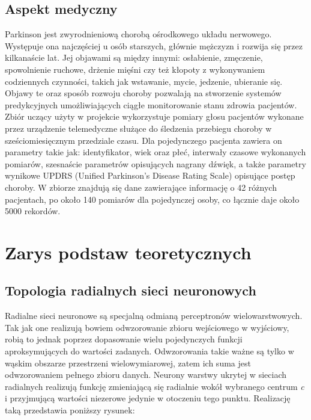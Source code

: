 \documentclass[12pt]{article}
\begin{document}
\subsection{Aspekt medyczny}

Parkinson jest zwyrodnieniową chorobą ośrodkowego układu nerwowego. Występuje ona najczęściej u osób starszych, głównie mężczyzn i rozwija się przez kilkanaście lat. Jej objawami są między innymi: osłabienie, zmęczenie, spowolnienie ruchowe, drżenie mięśni czy też kłopoty z wykonywaniem codziennych czynności, takich jak wstawanie, mycie, jedzenie, ubieranie się.  Objawy te oraz sposób rozwoju choroby pozwalają na stworzenie systemów predykcyjnych umożliwiających ciągłe monitorowanie stanu zdrowia pacjentów. Zbiór uczący użyty w projekcie wykorzystuje pomiary głosu pacjentów wykonane przez urządzenie telemedyczne służące do śledzenia przebiegu choroby w sześciomiesięcznym przedziale czasu. Dla pojedynczego pacjenta zawiera on parametry takie jak: identyfikator, wiek oraz płeć, interwały czasowe wykonanych pomiarów, szesnaście parametrów opisujących nagrany dźwięk, a także parametry wynikowe UPDRS (Unified Parkinson's Disease Rating Scale) opisujące postęp choroby. W zbiorze znajdują się dane zawierające informację o 42 różnych pacjentach, po około 140 pomiarów dla pojedynczej osoby, co łącznie daje około 5000 rekordów.

\section{Zarys podstaw teoretycznych}

\subsection{Topologia radialnych sieci neuronowych}

Radialne sieci neuronowe są specjalną odmianą perceptronów wielowarstwowych. Tak jak one realizują bowiem odwzorowanie zbioru wejściowego w wyjściowy, robią to jednak poprzez dopasowanie wielu pojedynczych funkcji aproksymujących do wartości zadanych. Odwzorowania takie ważne są tylko w wąskim obszarze przestrzeni wielowymiarowej, zatem ich suma jest odwzorowaniem pełnego zbioru danych. Neurony warstwy ukrytej w sieciach radialnych realizują funkcję zmieniającą się radialnie wokół wybranego centrum \textsl{c} i przyjmującą wartości niezerowe jedynie w otoczeniu tego punktu. Realizację taką przedstawia poniższy rysunek:
\end{document}
